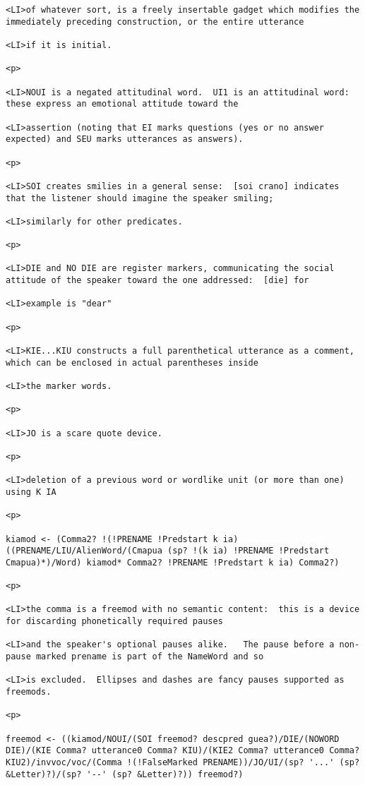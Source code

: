 \documentclass[12pt]{article}
\begin{document}
\begin{lstlisting}
<LI>of whatever sort, is a freely insertable gadget which modifies the immediately preceding construction, or the entire utterance

<LI>if it is initial.

<p>

<LI>NOUI is a negated attitudinal word.  UI1 is an attitudinal word:  these express an emotional attitude toward the

<LI>assertion (noting that EI marks questions (yes or no answer expected) and SEU marks utterances as answers).

<p>

<LI>SOI creates smilies in a general sense:  [soi crano] indicates that the listener should imagine the speaker smiling;

<LI>similarly for other predicates.

<p>

<LI>DIE and NO DIE are register markers, communicating the social attitude of the speaker toward the one addressed:  [die] for

<LI>example is "dear"

<p>

<LI>KIE...KIU constructs a full parenthetical utterance as a comment, which can be enclosed in actual parentheses inside

<LI>the marker words.

<p>

<LI>JO is a scare quote device.

<p>

<LI>deletion of a previous word or wordlike unit (or more than one) using K IA

<p>

kiamod <- (Comma2? !(!PRENAME !Predstart k ia) ((PRENAME/LIU/AlienWord/(Cmapua (sp? !(k ia) !PRENAME !Predstart Cmapua)*)/Word) kiamod* Comma2? !PRENAME !Predstart k ia) Comma2?)

<p>

<LI>the comma is a freemod with no semantic content:  this is a device for discarding phonetically required pauses

<LI>and the speaker's optional pauses alike.   The pause before a non-pause marked prename is part of the NameWord and so

<LI>is excluded.  Ellipses and dashes are fancy pauses supported as freemods.

<p>

freemod <- ((kiamod/NOUI/(SOI freemod? descpred guea?)/DIE/(NOWORD DIE)/(KIE Comma? utterance0 Comma? KIU)/(KIE2 Comma? utterance0 Comma? KIU2)/invvoc/voc/(Comma !(!FalseMarked PRENAME))/JO/UI/(sp? '...' (sp? &Letter)?)/(sp? '--' (sp? &Letter)?)) freemod?)


\end{lstlisting}
\end{document}
